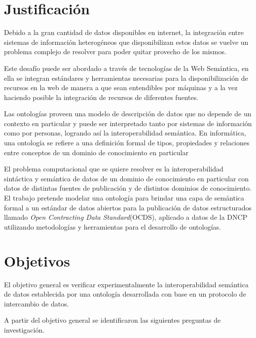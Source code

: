 \section{Justificación}

Debido a la gran cantidad de datos disponibles en internet, la integración entre sistemas de información heterogéneos que disponibilizan estos datos se vuelve un problema complejo de resolver para poder quitar provecho de los mismos. 

Este desafío puede ser abordado a través de tecnologías de la Web Semántica, en ella se integran estándares y herramientas necesarias para la disponibilización de recursos en la web de manera a que sean entendibles por máquinas y a la vez haciendo posible la integración de recursos de diferentes fuentes. 

Las ontologías proveen una modelo de descripción de datos que no depende de un contexto en particular y puede ser interpretado tanto por sistemas de información como por personas, logrando así la interoperabilidad semántica. En informática, una ontología se refiere a una definición formal de tipos, propiedades y relaciones entre conceptos de un dominio de conocimiento en particular

El problema computacional que se quiere resolver es la interoperabilidad sintáctica y semántica de datos de un dominio de conocimiento en particular con datos de distintas fuentes de publicación y de distintos dominios de conocimiento. El trabajo pretende modelar una ontología para brindar una capa de semántica formal a un estándar de datos abiertos para la publicación de datos estructurados llamado \textit{Open Contracting Data Standard}(OCDS), aplicado a datos de la DNCP utilizando metodologías y herramientas para el desarrollo de ontologías. 


\section{Objetivos}

El objetivo general es verificar experimentalmente la interoperabilidad semántica de datos establecida por una ontología desarrollada con base en un protocolo de intercambio de datos.

A partir del objetivo general se identificaron las siguientes preguntas de investigación.

